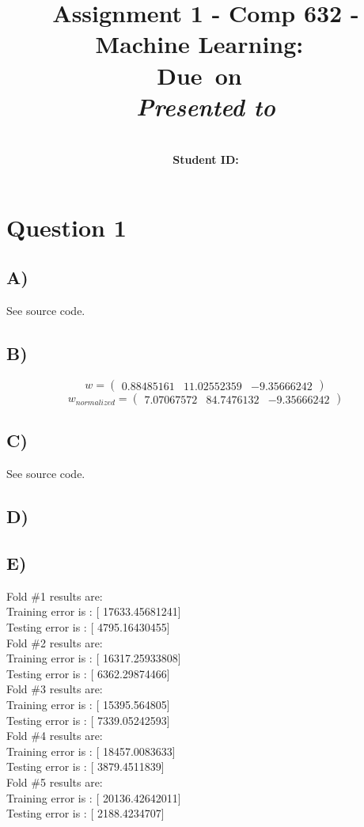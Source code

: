 \documentclass{report}
\title{Assignment 1 - Comp 632 - Machine Learning}
\title{\vspace{2in}\textmd{\textbf{\hmwkClass:\ \hmwkTitle}}\\
\normalsize\vspace{0.1in}\small{Due\ on\ \hmwkDueDate}\\
\vspace{0.1in}\large{\textit{Presented to \hmwkClassInstructor}}\vspace{3in}}
\date{}
\author{\textbf{\hmwkAuthorName}\\
    \textbf{Student ID: \hmwkAuthorNumber}}
\begin{document}
\maketitle
\section*{Question 1}
\subsection*{A)}
See source code.
\subsection*{B)}
\begin{equation}
  w = \begin{pmatrix}
        0.88485161 & 11.02552359 & -9.35666242
      \end{pmatrix}
\end{equation}
\begin{equation}
  w_{normalized} = \begin{pmatrix}
                    7.07067572 & 84.7476132 & -9.35666242
                    \end{pmatrix}
\end{equation}
\subsection*{C)}
See source code.
\subsection*{D)}
\subsection*{E)}
Fold \#1 results are:\\
Training error is : [ 17633.45681241]\\
Testing error is : [ 4795.16430455]\\
Fold \#2 results are:\\
Training error is : [ 16317.25933808]\\
Testing error is : [ 6362.29874466]\\
Fold \#3 results are:\\
Training error is : [ 15395.564805]\\
Testing error is : [ 7339.05242593]\\
Fold \#4 results are:\\
Training error is : [ 18457.0083633]\\
Testing error is : [ 3879.4511839]\\
Fold \#5 results are:\\
Training error is : [ 20136.42642011]\\
Testing error is : [ 2188.4234707]\\
\end{document}
